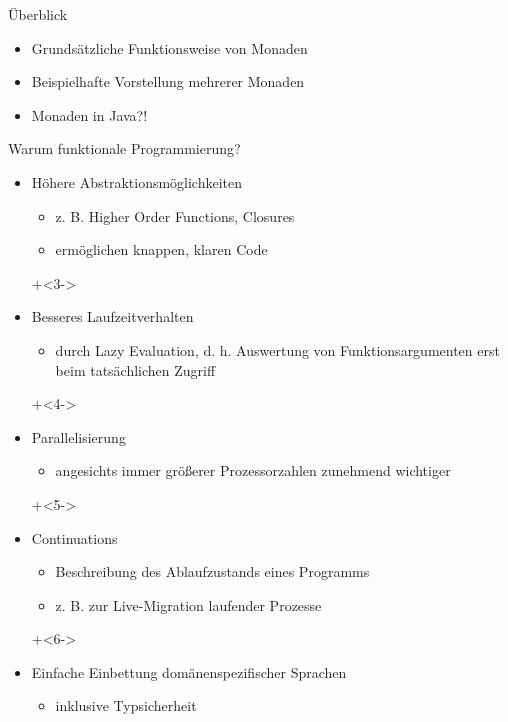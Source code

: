 \begin{frame}[fragile]{Überblick}
\begin{itemize}
\item Grundsätzliche Funktionsweise von Monaden
\item Beispielhafte Vorstellung mehrerer Monaden
\item Monaden in Java?!
\end{itemize}
\end{frame}


\begin{frame}[fragile]{Warum funktionale Programmierung?}
\begin{itemize}
\onslide+<2->
\item Höhere Abstraktionsmöglichkeiten
\begin{itemize}
\item z. B. Higher Order Functions, Closures
\item ermöglichen knappen, klaren Code
\end{itemize}

\onslide+<3->
\item Besseres Laufzeitverhalten
\begin{itemize}
\item durch Lazy Evaluation, d. h. Auswertung von Funktionsargumenten erst beim tatsächlichen Zugriff
\end{itemize}

\onslide+<4->
\item Parallelisierung
\begin{itemize}
\item angesichts immer größerer Prozessorzahlen zunehmend wichtiger
\end{itemize}

\onslide+<5->
\item Continuations
\begin{itemize}
\item Beschreibung des Ablaufzustands eines Programms 
\item z. B. zur Live-Migration laufender Prozesse
\end{itemize}

\onslide+<6->
\item Einfache Einbettung domänenspezifischer Sprachen
\begin{itemize}
\item inklusive Typsicherheit
\end{itemize}

\end{itemize}
\end{frame}

